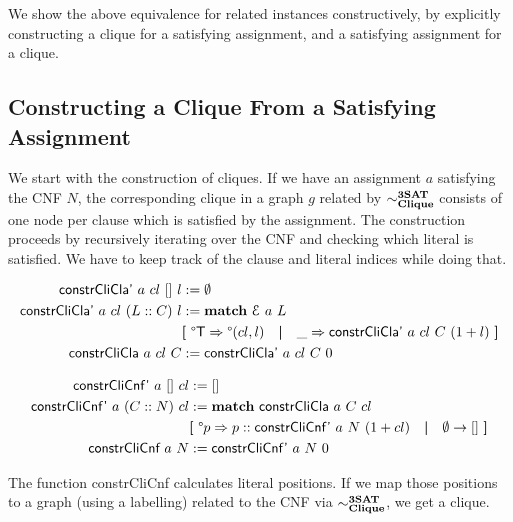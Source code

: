\documentclass[a4paper,UKenglish,cleveref, autoref]{lipics-v2019}
\begin{document}
We show the above equivalence for related instances constructively, by explicitly constructing a clique for a satisfying assignment, and a satisfying assignment for a clique. 

\subsection{Constructing a Clique From a Satisfying Assignment}
We start with the construction of cliques. If we have an assignment $a$ satisfying the CNF $N$, the corresponding clique in a graph $g$ related by $\sim^{\textbf{3SAT}}_{\textbf{Clique}}$ consists of one node per clause which is satisfied by the assignment. The construction proceeds by recursively iterating over the CNF and checking which literal is satisfied. We have to keep track of the clause and literal indices while doing that.

\begin{align*}
  \textsf{constrCliCla'}~a~cl~[]~l &:= \emptyset \\
  \textsf{constrCliCla'}~a~cl~(L::C)~l &:= \textbf{match}~ \mathcal{E}~a~L~ \\
  &\textbf{[}~ \degree\mathsf{T} \Rightarrow \degree(cl, l) \quad\textbf{|}\quad \_ \Rightarrow \textsf{constrCliCla'}~a~cl~C~(1 +{l}) ~\textbf{]}\\
  \textsf{constrCliCla}~a~cl~C &:= \textsf{constrCliCla'}~a~cl~C~0
\end{align*}

\begin{align*}
  \textsf{constrCliCnf'}~a~[]~cl &:= [] \\
  \textsf{constrCliCnf'}~a~(C::N)~cl &:= \textbf{match}~ \textsf{constrCliCla}~a~C~cl \\
  &\textbf{[}~ \degree p \Rightarrow p :: \textsf{constrCliCnf'}~a~N~(1 +{cl}) \quad\textbf{|}\quad \emptyset \rightarrow [] ~\textbf{]}\\
  \textsf{constrCliCnf}~a~N &:= \textsf{constrCliCnf'}~a~N~0
\end{align*}

The function \textsf{constrCliCnf} calculates literal positions. If we map those positions to a graph (using a labelling) related to the CNF via $\sim^{\textbf{3SAT}}_{\textbf{Clique}}$, we get a clique.
\end{document}
